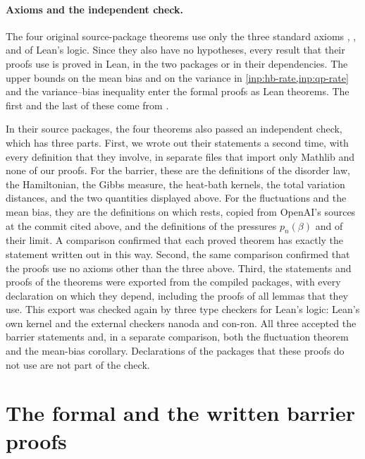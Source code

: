 \paragraph{Axioms and the independent check.} The four original source-package theorems use only the three standard axioms , , and  of Lean's logic. Since they also have no hypotheses, every result that their proofs use is proved in Lean, in the two packages or in their dependencies. The upper bounds on the mean bias and on the variance in \cref{inp:hb-rate,inp:qp-rate} and the variance--bias inequality enter the formal proofs as Lean theorems. The first and the last of these come from \cite{hexagon-bias-lean}.

In their source packages, the four theorems also passed an independent check, which has three parts. First, we wrote out their statements a second time, with every definition that they involve, in separate files that import only Mathlib and none of our proofs. For the barrier, these are the definitions of the disorder law, the Hamiltonian, the Gibbs measure, the heat-bath kernels, the total variation distances, and the two quantities displayed above. For the fluctuations and the mean bias, they are the definitions on which  rests, copied from OpenAI's sources at the commit cited above, and the definitions of the pressures $p_n(\beta)$ and of their limit. A comparison confirmed that each proved theorem has exactly the statement written out in this way. Second, the same comparison confirmed that the proofs use no axioms other than the three above. Third, the statements and proofs of the theorems were exported from the compiled packages, with every declaration on which they depend, including the proofs of all lemmas that they use. This export was checked again by three type checkers for Lean's logic: Lean's own kernel and the external checkers nanoda and con-ron. All three accepted the barrier statements and, in a separate comparison, both the fluctuation theorem and the mean-bias corollary. Declarations of the packages that these proofs do not use are not part of the check.

\section{The formal and the written barrier proofs}\label{sec:formal-barrier}


